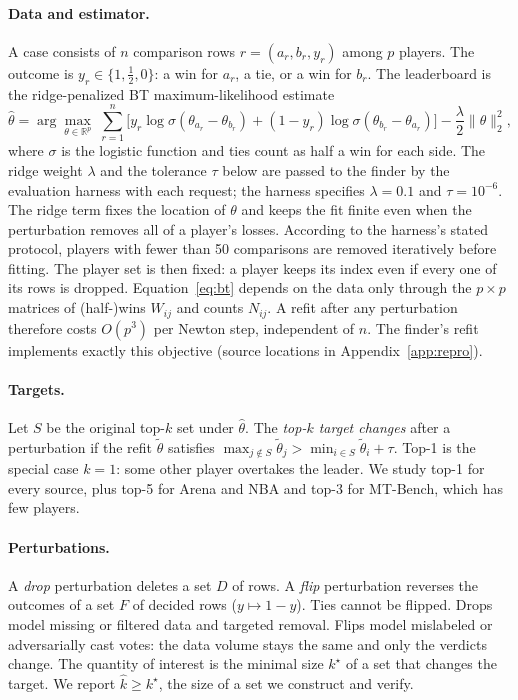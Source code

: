\documentclass{article}
\newcommand{\kver}{\hat{k}}
\begin{document}
\paragraph{Data and estimator.}
A case consists of $n$ comparison rows $r=(a_r,b_r,y_r)$ among $p$ players. The outcome is $y_r\in\{1,\tfrac12,0\}$: a win for $a_r$, a tie, or a win for $b_r$. The leaderboard is the ridge-penalized BT maximum-likelihood estimate
\begin{equation}
\hat\theta=\arg\max_{\theta\in\mathbb{R}^p}\;\sum_{r=1}^{n}\Big[y_r\log\sigma(\theta_{a_r}-\theta_{b_r})+(1-y_r)\log\sigma(\theta_{b_r}-\theta_{a_r})\Big]-\frac{\lambda}{2}\|\theta\|_2^2 ,
\label{eq:bt}
\end{equation}
where $\sigma$ is the logistic function and ties count as half a win for each side. The ridge weight $\lambda$ and the tolerance $\tau$ below are passed to the finder by the evaluation harness with each request; the harness specifies $\lambda=0.1$ and $\tau=10^{-6}$. The ridge term fixes the location of $\theta$ and keeps the fit finite even when the perturbation removes all of a player's losses. According to the harness's stated protocol, players with fewer than 50 comparisons are removed iteratively before fitting. The player set is then fixed: a player keeps its index even if every one of its rows is dropped. Equation~\eqref{eq:bt} depends on the data only through the $p\times p$ matrices of (half-)wins $W_{ij}$ and counts $N_{ij}$. A refit after any perturbation therefore costs $O(p^3)$ per Newton step, independent of $n$. The finder's refit implements exactly this objective (source locations in Appendix~\ref{app:repro}).

\paragraph{Targets.}
Let $S$ be the original top-$k$ set under $\hat\theta$. The \emph{top-$k$ target changes} after a perturbation if the refit $\tilde\theta$ satisfies $\max_{j\notin S}\tilde\theta_j>\min_{i\in S}\tilde\theta_i+\tau$. Top-1 is the special case $k=1$: some other player overtakes the leader. We study top-1 for every source, plus top-5 for Arena and NBA and top-3 for MT-Bench, which has few players.

\paragraph{Perturbations.}
A \emph{drop} perturbation deletes a set $D$ of rows. A \emph{flip} perturbation reverses the outcomes of a set $F$ of decided rows ($y\mapsto 1-y$). Ties cannot be flipped. Drops model missing or filtered data and targeted removal. Flips model mislabeled or adversarially cast votes: the data volume stays the same and only the verdicts change. The quantity of interest is the minimal size $k^\star$ of a set that changes the target. We report $\kver\ge k^\star$, the size of a set we construct and verify.
\end{document}
